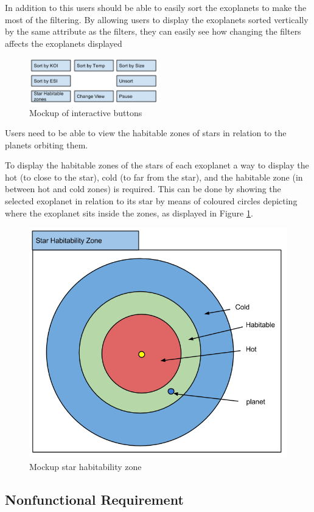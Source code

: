 \begin{enumerate}
In addition to this users should be able to easily sort the exoplanets to make
the most of the filtering. By allowing users to display the exoplanets sorted
vertically by the same attribute as the filters, they can easily see how
changing the filters affects the exoplanets displayed

\begin{figure}[H]
  \centering
      \includegraphics[width=0.5\textwidth]{images/mockButtons.png}
  \caption{Mockup of interactive buttons}  
\end{figure}


{\bf
 \item[R5.] Users need to be able to view the habitable zones of stars in
relation to the planets orbiting them.}

To display the habitable zones of the stars of each exoplanet a way to display
the hot (to close to the star), cold (to far from the star), and the habitable
zone (in between hot and cold zones) is required. This can be done by showing
the selected exoplanet in relation to its star by means of coloured circles
depicting where the exoplanet sits inside the zones, as displayed in Figure
\ref{fig:hab}. 

\begin{figure}[H]
  \centering
      \includegraphics[width=.5\textwidth]{images/mockStarHabitability.png}
  \caption{Mockup star habitability zone}  
  \label{fig:hab}
\end{figure}




\end{enumerate}

\subsection{Nonfunctional Requirement}

